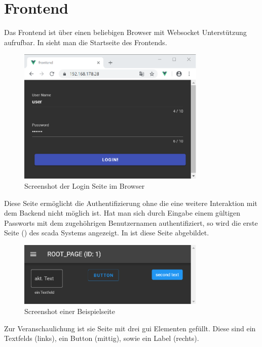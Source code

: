 \section{Frontend}\label{sec:poc:frontend}
Das Frontend ist über einen beliebigen Browser mit Websocket Unterstützung aufrufbar.
In  sieht man die Startseite des Frontends.
\begin{figure}[H]
  \centering
  \includegraphics[width=0.8\textwidth]{content/hauptteil/umsetzungPoC/frontend/res/login.pdf}
  \caption{Screenshot der Login Seite im Browser}
  \label{fig:frontend:poc:login}
\end{figure}
Diese Seite ermöglicht die Authentifizierung ohne die eine weitere Interaktion mit dem Backend nicht möglich ist.
Hat man sich durch Eingabe einem gültigen Passworts mit dem zugehöhrigen Benutzernamen authentifiziert, 
so wird die erste Seite () des \ac{scada} Systems angezeigt. In  ist diese Seite abgebildet.
\begin{figure}[ht]
  \centering
  \includegraphics[width=0.8\textwidth]{content/hauptteil/umsetzungPoC/frontend/res/page.pdf}
  \caption{Screenshot einer Beispielseite}
  \label{fig:frontend:poc:page}
\end{figure}
Zur Veranschaulichung ist sie Seite mit drei \ac{gui} Elementen gefüllt. 
Diese sind ein Textfelds (links), ein Button (mittig), sowie ein Label (rechts).
